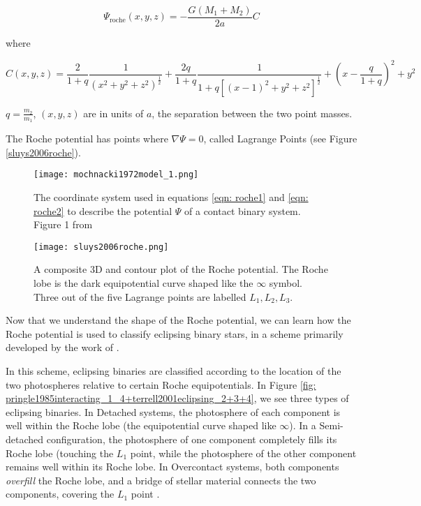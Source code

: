 \documentclass[12pt]{article} %
\numberwithin{equation}{section} %
\begin{document}
\begin{equation} \label{eqn: roche1}
\Psi_{\text{roche}}(x,y,z)= -\frac{G(M_{1} + M_{2})}{2a} C
\end{equation}

where 

\begin{equation} \label{eqn: roche2}
C(x,y,z) = \frac{2}{1+q} \frac{1}{(x^{2} + y^{2} + z^{2})^{\frac{1}{2}}} + \frac{2q}{1 + q} \frac{1}{1 + q[(x -1)^{2} + y^{2} + z^{2}]^{\frac{1}{2}}} + (x - \frac{q}{1 + q})^{2} + y^{2}
\end{equation}

$q = \frac{m_{2}}{m_{1}}$, $(x,y,z)$ are in units of $a$, the separation between the two point masses.

The Roche potential has points where $\nabla \Psi = 0$, called Lagrange Points (see Figure \ref{sluys2006roche}). 

\begin{figure}[H]
\centering
\texttt{[image: mochnacki1972model\_1.png]}
\caption{The coordinate system used in equations \ref{eqn: roche1} and \ref{eqn: roche2} to describe the potential $\Psi$ of a contact binary system. Figure 1 from \citet{mochnacki1972model}}
\label{fig: mochnacki1972model_1}
\end{figure}

\begin{figure}[H]
\centering
\texttt{[image: sluys2006roche.png]}
\caption{A composite 3D and contour plot of the Roche potential. The Roche lobe is the dark equipotential curve shaped like the $\infty$ symbol. Three out of the five Lagrange points are labelled $L_{1}, L_{2}, L_{3}$.  \citep{sluys2006roche}}
\label{fig: sluys2006roche}
\end{figure}

Now that we understand the shape of the Roche potential, we can learn how the Roche potential is used to classify eclipsing binary stars, in a scheme primarily developed by the work of \citet{kopal1959close}.

In this scheme, eclipsing binaries are classified according to the location of the two photospheres relative to certain Roche equipotentials. In Figure \ref{fig: pringle1985interacting_1_4+terrell2001eclipsing_2+3+4}, we see three types of eclipsing binaries. In Detached systems, the photosphere of each component is well within the Roche lobe (the equipotential curve shaped like $\infty$). In a Semi-detached configuration, the photosphere of one component completely fills its Roche lobe (touching the $L_{1}$ point, while the photosphere of the other component remains well within its Roche lobe. In Overcontact systems, both components \emph{overfill} the Roche lobe, and a bridge of stellar material connects the two components, covering the $L_{1}$ point \citep{terrell2001eclipsing}.
\end{document}
